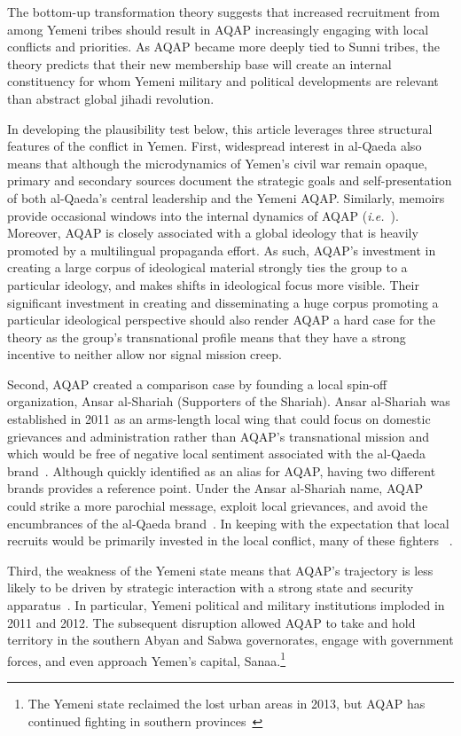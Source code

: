 The bottom-up transformation theory suggests that increased recruitment from among Yemeni tribes should result in AQAP increasingly engaging with local conflicts and priorities. As AQAP became more deeply tied to Sunni tribes, the theory predicts that their new membership base will create an internal constituency for whom Yemeni military and political developments are relevant than abstract global jihadi revolution. 

In developing the plausibility test below, this article leverages three structural features of the conflict in Yemen.  First, widespread interest in al-Qaeda also means that although the microdynamics of Yemen's civil war remain opaque, primary and secondary sources document the strategic goals and self-presentation of both al-Qaeda's central leadership and the Yemeni AQAP.  Similarly, memoirs provide occasional windows into the internal dynamics of AQAP (\textit{i.e.}~\autocite{bahri2013guarding, storm2014agent}). Moreover, AQAP is closely associated with a global ideology that is heavily promoted by a multilingual propaganda effort. As such, AQAP's investment in creating a large corpus of ideological material strongly ties the group to a particular ideology, and makes shifts in ideological focus more visible. Their significant investment in creating and disseminating a huge corpus promoting a particular ideological perspective should also render AQAP a hard case for the theory as the group's transnational profile means that they have a strong incentive to neither allow nor signal mission creep. 
 
Second, AQAP created a comparison case by founding a local spin-off organization, Ansar al-Shariah (Supporters of the Shariah).  Ansar al-Shariah was established in 2011 as an arms-length local wing that could focus on domestic grievances and administration rather than AQAP's transnational mission and which would be free of negative local sentiment associated with the al-Qaeda brand~\autocite{ICG2017Yemen}. Although quickly identified as an alias for AQAP, having two different brands provides a reference point. Under the Ansar al-Shariah name, AQAP could strike a more parochial message, exploit local grievances, and avoid the encumbrances of the al-Qaeda brand~\autocite{swiftctc2012arc}.  In keeping with the expectation that local recruits would be primarily invested in the local conflict, many of these fighters ~\autocite[14]{hrw2013drone}.

Third, the weakness of the Yemeni state means that AQAP's trajectory is less likely to be driven by strategic interaction with a strong state and security apparatus~\autocite{ctr2016terrorism}. In particular, Yemeni political and military institutions imploded in 2011 and 2012. The subsequent disruption allowed AQAP to take and hold territory in the southern Abyan and Sabwa governorates, engage with government forces, and even approach Yemen's capital, Sanaa.\footnote{The Yemeni state reclaimed the lost urban areas in 2013, but AQAP has continued fighting in southern provinces~\autocite[9]{sharp2015background}} 

